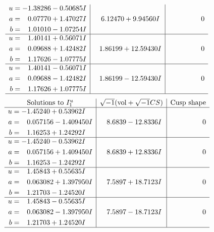 \documentclass[1p]{elsarticle_modified}
\theoremstyle{definition}
\newcommand{\I}{\sqrt{-1}}
\begin{document}
$$\begin{array}{c|c|c}
\begin{aligned}
u &= -1.38286 - 0.50685 I \\
a &= \phantom{-}0.07770 + 1.47027 I \\
b &= \phantom{-}1.01010 - 1.07254 I\end{aligned}
 & \phantom{-}6.12470 + 9.94560 I & \phantom{-0.000000 } 0 \\ \hline\begin{aligned}
u &= \phantom{-}1.40141 + 0.56071 I \\
a &= \phantom{-}0.09688 + 1.42482 I \\
b &= \phantom{-}1.17626 - 1.07775 I\end{aligned}
 & \phantom{-}1.86199 + 12.59430 I & \phantom{-0.000000 } 0 \\ \hline\begin{aligned}
u &= \phantom{-}1.40141 - 0.56071 I \\
a &= \phantom{-}0.09688 - 1.42482 I \\
b &= \phantom{-}1.17626 + 1.07775 I\end{aligned}
 & \phantom{-}1.86199 - 12.59430 I & \phantom{-0.000000 } 0\\
 \hline 
 \end{array}$$\newpage$$\begin{array}{c|c|c}  
\text{Solutions to }I^u_{1}& \I (\text{vol} + \sqrt{-1}CS) & \text{Cusp shape}\\
 \hline 
\begin{aligned}
u &= -1.45240 + 0.53962 I \\
a &= \phantom{-}0.057156 - 1.409450 I \\
b &= \phantom{-}1.16253 + 1.24292 I\end{aligned}
 & \phantom{-}8.6839 - 12.8336 I & \phantom{-0.000000 } 0 \\ \hline\begin{aligned}
u &= -1.45240 - 0.53962 I \\
a &= \phantom{-}0.057156 + 1.409450 I \\
b &= \phantom{-}1.16253 - 1.24292 I\end{aligned}
 & \phantom{-}8.6839 + 12.8336 I & \phantom{-0.000000 } 0 \\ \hline\begin{aligned}
u &= \phantom{-}1.45843 + 0.55635 I \\
a &= \phantom{-}0.063082 + 1.397950 I \\
b &= \phantom{-}1.21703 - 1.24520 I\end{aligned}
 & \phantom{-}7.5897 + 18.7123 I & \phantom{-0.000000 } 0 \\ \hline\begin{aligned}
u &= \phantom{-}1.45843 - 0.55635 I \\
a &= \phantom{-}0.063082 - 1.397950 I \\
b &= \phantom{-}1.21703 + 1.24520 I\end{aligned}
 & \phantom{-}7.5897 - 18.7123 I & \phantom{-0.000000 } 0\\
 \hline 
 \end{array}$$\newpage\newpage\renewcommand{\arraystretch}{1}
\end{document}
